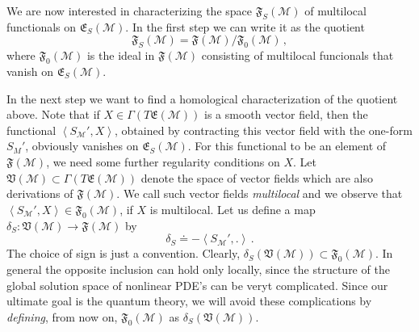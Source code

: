 \documentclass[12pt]{article}
\newcommand{\E}{\mathfrak{E}}
\newcommand{\V}{\mathfrak{V}}
\newcommand{\F}{\mathfrak{F}}
\newcommand{\Mcal}{\mathcal{M}}
\newcommand{\1}{\mathds{1}}                         %
\begin{document}
{We are now interested in characterizing the space $\F_S(\Mcal)$ of multilocal functionals on $\E_S(\Mcal)$. In the first step we can write it as the quotient
\[
\F_S(\Mcal)=\F(\Mcal)/\F_0(\Mcal)\,,
\]
where $\F_0(\Mcal)$ is the ideal in $\F(\Mcal)$ consisting of multilocal funcionals that vanish on $\E_S(\Mcal)$. 

In the next step we want to find a homological characterization of the quotient above. Note that if $X\in\Gamma(T\E(\Mcal))$ is a smooth vector field, then the functional $\left< S_\Mcal',X\right>$, obtained by contracting this vector field with the one-form $S_M'$, obviously vanishes on $\E_S(\Mcal)$. For this functional to be an element of $\F(\Mcal)$, we need some further regularity conditions on $X$. Let $\V(\Mcal)\subset\Gamma(T\E(\Mcal))$ denote the space of vector fields which are also derivations of $\F(\Mcal)$. We call such vector fields \textit{multilocal} and we observe that $\left< S_\Mcal',X\right>\in\F_0
(\Mcal)$, if $X$ is multilocal. Let us define a map $\delta_S:\V(\Mcal)\rightarrow\F(\Mcal)$ by 
\[\delta_S\doteq -\left< S_\Mcal',.\right>\,.
\]
The choice of sign is just a convention. Clearly, $\delta_S(\V(\Mcal))\subset\F_0(\Mcal)$. In general the opposite inclusion can hold only locally, since the structure of the global solution space of nonlinear PDE's can be veryt complicated. Since our ultimate goal is the quantum theory, we will avoid these complications by \textit{defining}, from now on, $\F_0(\Mcal)$ as $\delta_S(\V(\Mcal))$.

}
\end{document}
